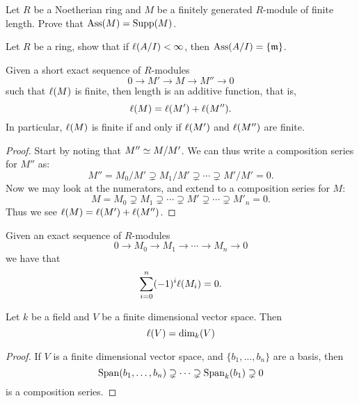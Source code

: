 \documentclass{ximera}
\begin{document}
\begin{exercise}
  Let $R$ be a Noetherian ring and $M$ be a finitely generated
  $R$-module of finite length. Prove that $\operatorname{Ass}(M) = \operatorname{Supp}(M)$.
\end{exercise}

\begin{exercise}
  Let $R$ be a ring, show that if $\ell(A/I)<\infty$, then $\operatorname{Ass}(A/I) =
  \{\mathfrak{m}\}$.
\end{exercise}





\begin{proposition}\label{P:AL}
  Given a short exact sequence of $R$-modules
  \[
  0\to M' \to M\to M'' \to 0
  \]
  such that $\ell(M)$ is finite, then length is an additive function, that is,
  \[
  \ell(M) = \ell(M')+\ell(M'').
  \]
  In particular, $\ell(M)$ is finite if and only if $\ell(M')$ and
  $\ell(M'')$ are finite.
  \begin{proof}
    Start by noting that $M''\simeq M/M'$. We can thus write a
    composition series for $M''$ as:
    \[
    M'' = M_0/M' \supsetneq M_1/M' \supsetneq \cdots \supsetneq M'/M'  = 0.
    \]
    Now we may look at the numerators, and extend to a composition
    series for $M$:
    \[
    M = M_0 \supsetneq M_1 \supsetneq \cdots \supsetneq M' \supsetneq \cdots \supsetneq M'_n = 0.
    \]
    Thus we see $\ell(M) = \ell(M')+\ell(M'')$.
  \end{proof}
\end{proposition}

\begin{corollary}\label{C:Lles}
  Given an exact sequence of $R$-modules
  \[
  0 \to M_0\to M_1\to \cdots \to M_n \to 0
  \]
  we have that
  \[
  \sum_{i=0}^n (-1)^i \ell(M_i) = 0.
  \]
\end{corollary}



\begin{proposition}
  Let $k$ be a field and $V$ be a finite dimensional vector
  space. Then
  \[
  \ell(V) = \dim_k(V)
  \]
  \begin{proof}
    If $V$ is a finite dimensional vector space, and
    $\{b_1,\dots,b_n\}$ are a basis, then
    \[
    \operatorname{Span}(b_1,\dots,b_n) \supsetneq \dots \supsetneq \operatorname{Span}_k(b_1) \supsetneq 0
    \]
    is a composition series.
  \end{proof}
\end{proposition}
\end{document}
